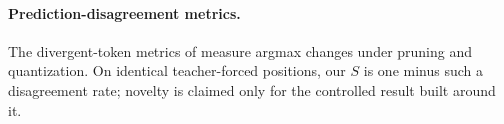 \paragraph{Prediction-disagreement metrics.}
The divergent-token metrics of \citet{deiseroth2024dtm} measure argmax changes
under pruning and quantization. On identical teacher-forced positions, our $S$
is one minus such a disagreement rate; novelty is claimed only for the
controlled result built around it.
